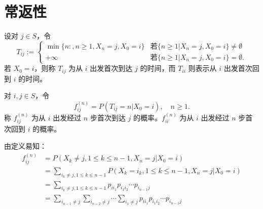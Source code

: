 \documentclass[lang=cn,10pt,thmcnt=section]{elegantbook}
\begin{document}
\section{常返性}
\begin{definition}[首达时间]
	设对 $j \in S$，令
\[
T_{ij} := 
\begin{cases} 
\min\{n:, n \geq 1, X_n = j, X_0 = i\} & \text{若} \{n \geq 1 | X_n = j, X_0 = i\} \neq \emptyset \\
+\infty & \text{若} \{n \geq 1 | X_n = j, X_0 = i\} = \emptyset.
\end{cases}
\]
若 $X_0 = i$，则称 $T_{ij}$ 为从 $i$ 出发首次到达 $j$ 的时间，而 $T_{ii}$ 则表示从 $i$ 出发首次回到 $i$ 的时间。
\end{definition}
\begin{definition}[首达概率]
	对 $i, j \in S$，令
\[
f_{ij}^{(n)} = P(T_{ij} = n | X_0 = i), \quad n \geq 1.
\]
称 $f_{ij}^{(n)}$ 为从 $i$ 出发经过 $n$ 步首次到达 $j$ 的概率。$f_{ii}^{(n)}$ 为从 $i$ 出发经过 $n$ 步首次回到 $i$ 的概率。
\end{definition}
由定义易知：
\begin{align*}
f_{ij}^{(n)} &= P(X_k \neq j, 1 \leq k \leq n-1, X_n = j | X_0 = i) \\
&= \sum_{i_k \neq j, 1 \leq k \leq n-1} P(X_k = i_k, 1 \leq k \leq n-1, X_n = j | X_0 = i) \\
&= \sum_{i_k \neq j, 1 \leq k \leq n-1} p_{ii_1} p_{i_1 i_2} \cdots p_{i_{n-1} j} \\
&= \sum_{i_{n-1} \neq j} \sum_{i_{n-2} \neq j} \cdots \sum_{i_1 \neq j} p_{ii_1} p_{i_1 i_2} \cdots p_{i_{n-1} j}
\end{align*}
\end{document}
